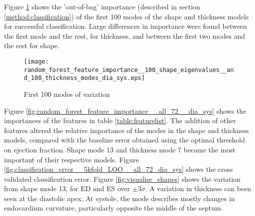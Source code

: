 \documentclass{llncs}
\begin{document}
 		  
			Figure \ref{fig:random_forest_feature_importance__100_shape_eigenvalues__and_100_thickness_modes_dia_sys} shows the 'out-of-bag' importance (described in section  \ref{method:classification}) of the first 100 modes of the shape and thickness models for successful classification. Large differences in importance were found between the first mode and the rest, for thickness, and between the first two modes and the rest for shape. %
		
			
				\begin{figure}[]
		\begin{center}
		
		\texttt{[image: random\_forest\_feature\_importance\_\_100\_shape\_eigenvalues\_\_and\_100\_thickness\_modes\_dia\_sys.eps]}
	\caption{First 100 modes of variation}	
\label{fig:random_forest_feature_importance__100_shape_eigenvalues__and_100_thickness_modes_dia_sys}			\end{center}
		\end{figure}
		
		Figure \ref{fig:random_forest_feature_importance__all_72__dia_sys} shows the importances of the features in table \ref{table:featurelist}. The addition of other features altered the relative importance of the modes in the shape and thickness models, compared with the baseline error obtained using the optimal threshold on ejection fraction. Shape mode 13 and thickness mode 7 became the most important of their respective models. Figure    \ref{fig:classification_error__5kfold_LOO__all_72_dia_sys} shows the cross validated classification error. Figure \ref{fig:visualise_shapes} shows the variation from shape mode 13, for ED and ES over $\pm$3$\sigma$. A variation in thickness can been seen at the diastolic apex. At systole, the mode describes mostly changes in endocardium curvature, particularly opposite the middle of the septum.
		
\end{document}
